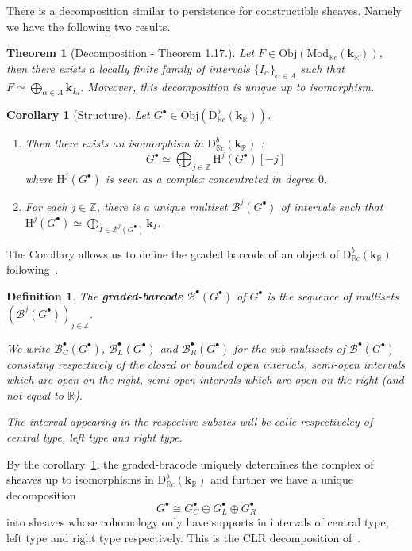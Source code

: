 \documentclass[a4paper, english, 11pt]{article}
\newcommand{\kk}[0]{\textbf{k}}
\newcommand{\Mod}[0]{\text{Mod}}
\newcommand{\0}{\vec{0}}
\newcommand{\R}[0]{\mathbb{R}}
\newcommand{\Z}[0]{\mathbb{Z}}
\newcommand{\B}[0]{\mathcal{B}}
\newcommand{\D}[0]{\text{D}}
\newcommand{\Obj}[0]{\text{Obj}}
\newcommand{\Ho}[0]{\text{H}}
\newtheorem{cor}[prop]{Corollary}
\newtheorem{defi}[prop]{Definition}
\newtheorem{thm}[prop]{Theorem}
\begin{document}
There is a decomposition similar to persistence for constructible sheaves. Namely we have the following two results.
\begin{thm}[Decomposition - \cite{KS18} Theorem 1.17.]\label{T:KSdecomposition}
Let $F \in \Obj(\Mod_{\R c}(\kk_\R))$, then there exists a locally finite family of intervals $\{I_\alpha\}_{\alpha \in A}$ such that $F \simeq \bigoplus_{\alpha \in A} \kk_{I_\alpha}$. Moreover, this decomposition is unique up to isomorphism.
\end{thm}
\begin{cor}[Structure]\label{T:KSstructure}
Let $G^\bullet\in \Obj(\D^b_{\R c}(\kk_\R))$. 
\begin{enumerate} \item Then there exists an isomorphism in $\D^b_{\R c}(\kk_\R)$ : $$G^\bullet \simeq \bigoplus_{j\in\Z} \Ho^j(G^\bullet)[-j]$$
where $\Ho^j(G^\bullet)$ is seen as a complex concentrated in degree $0$.
\item For each $j\in \Z$, there is a unique multiset $\B^j(G^\bullet) $ of intervals such that  $\Ho^j(G^\bullet)\simeq \bigoplus_{I \in \B^j(G^\bullet)} \kk_{I}$. 
\end{enumerate}\end{cor}
The Corollary allows us to define the graded barcode of an object of $\D^b_{\R c}(\kk_\R)$ following~\cite{Berk18}.
\begin{defi}\label{D:gradedbarcode}
 The \textbf{graded-barcode} $\B^\bullet(G^\bullet)$ of $G^\bullet$ is the sequence of multisets $(\B^j(G^\bullet))_{j\in \Z}$.
 
We write $\B_C^\bullet(G^\bullet)$, $\B_L^\bullet(G^\bullet)$ and $\B_R^\bullet(G^\bullet)$ for the  sub-multisets of $\B^\bullet(G^\bullet)$ consisting respectively of the closed or bounded open intervals, semi-open intervals which are open on the right,  semi-open intervals which are open on the right (and not equal to $\R$). 

The interval appearing in the respective substes will be calle respectiveley of central type, left type and right type.
 \end{defi}
By the corollary~\ref{T:KSstructure}, the graded-bracode uniquely determines the complex of sheaves up to isomorphisms in $\D^b_{\R c}(\kk_\R)$ and further we have a unique decomposition $$G^\bullet \cong G_C^\bullet \oplus G_L^\bullet \oplus G_R^\bullet $$ into sheaves whose cohomology only have supports    
in intervals of central type, left type and right type respectively. This is the CLR decomposition of~\cite{Berk18}.
\end{document}
